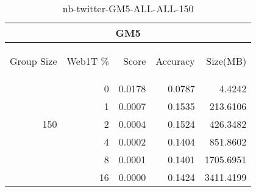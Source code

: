 \begin{center}
\begin{table}[htbp]
\begin{tabular}{ | r | r | r | r | r |}
\hline
\multicolumn{5}{|c|}{GM5}\\
\hline
\begin{sideways}Group Size\end{sideways} & \begin{sideways}Web1T \%\end{sideways} & \begin{sideways}Score\end{sideways} & \begin{sideways}Accuracy\end{sideways} & \begin{sideways}Size(MB)\end{sideways}\\
\hline
\multirow{5}{*}{150}
 & 0 & 0.0178 & 0.0787 & 4.4242\\ \cline{2-5}
 & 1 & 0.0007 & 0.1535 & 213.6106\\ \cline{2-5}
 & 2 & 0.0004 & 0.1524 & 426.3482\\ \cline{2-5}
 & 4 & 0.0002 & 0.1404 & 851.8602\\ \cline{2-5}
 & 8 & 0.0001 & 0.1401 & 1705.6951\\ \cline{2-5}
 & 16 & 0.0000 & 0.1424 & 3411.4199\\ \cline{2-5}
\hline
\end{tabular}
\caption{nb-twitter-GM5-ALL-ALL-150}
\label{table:nb-twitter-GM5-ALL-ALL-150}
\end{table}
\end{center}

